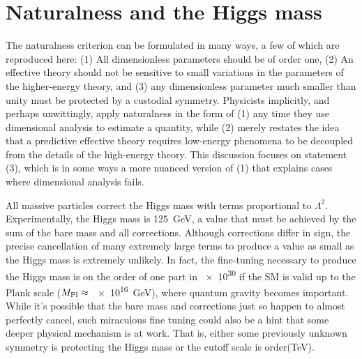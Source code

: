 \documentclass[12pt]{article}
\begin{document}
\section{Naturalness and the Higgs mass}

    The naturalness criterion can be formulated in many ways, a few of which are reproduced here: (1) All dimensionless parameters should be of order one, (2) An effective theory should not be sensitive to small variations in the parameters of the higher-energy theory, and (3) any dimensionless parameter much smaller than unity must be protected by a custodial symmetry. Physicists implicitly, and perhaps unwittingly, apply naturalness in the form of (1) any time they use dimensional analysis to estimate a quantity, while (2) merely restates the idea that a predictive effective theory requires low-energy phenomena to be decoupled from the details of the high-energy theory. This discussion focuses on statement (3), which is in some ways a more nuanced version of (1) that explains cases where dimensional analysis fails.

    All massive particles correct the Higgs mass with terms proportional to $\Lambda^2$. Experimentally, the Higgs mass is \SI{125}{\giga\electronvolt}, a value that must be achieved by the sum of the bare mass and all corrections. Although corrections differ in sign, the precise cancellation of many extremely large terms to produce a value as small as the Higgs mass is extremely unlikely. In fact, the fine-tuning necessary to produce the Higgs mass is on the order of one part in \num{e30} if the SM is valid up to the Plank scale ($M_{\mathrm{Pl}}\approx$ \SI{e16}{\giga\electronvolt}), where quantum gravity becomes important. While it's possible that the bare mass and corrections just so happen to almost perfectly cancel, such miraculous fine tuning could also be a hint that some deeper physical mechanism is at work. That is, either some previously unknown symmetry is protecting the Higgs mass or the cutoff scale is order(TeV).
    
\end{document}
